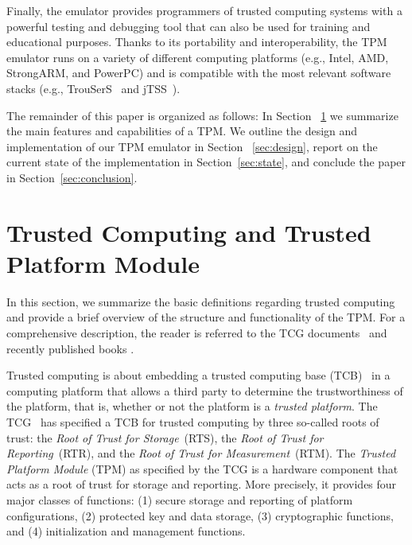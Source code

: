 \documentclass[runningheads]{llncs}
\begin{document}
Finally, the emulator provides
programmers of trusted computing systems with a powerful testing and
debugging tool that can also be used for training and educational purposes.
Thanks to its portability and interoperability, the TPM emulator runs on a
variety of different computing platforms (e.g., Intel, AMD, StrongARM, and
PowerPC) and is compatible with the most relevant software stacks (e.g.,
TrouSerS~\cite{trousers} and jTSS~\cite{jTSS}).

The remainder of this paper is organized as follows: In Section~%
\ref{sec:background} we summarize the main features and capabilities of a TPM.
We outline the design and implementation of our TPM emulator in Section~%
\ref{sec:design}, report on the current state of the implementation in
Section~\ref{sec:state}, and conclude the paper in Section~\ref{sec:conclusion}.


\section{Trusted Computing and Trusted Platform Module}\label{sec:background}
In this section, we summarize the basic definitions regarding trusted
computing and provide a brief overview of the structure and functionality of
the TPM. For a comprehensive description, the reader is referred to the TCG
documents~\cite{TCGArch,TPM} and recently published books \cite{Mitchell2005}.

Trusted computing is about embedding a trusted computing base
(TCB)~\cite{Bishop2003} in a computing platform that allows a third party
to determine the trustworthiness of the platform, that is, whether or not
the platform is a \emph{trusted platform}.
The TCG~\cite{TCGArch} has specified a TCB for trusted computing by three
so-called roots of trust: the \emph{Root of Trust for Storage}~(RTS), the
\emph{Root of Trust for Reporting}~(RTR), and the \emph{Root of Trust for
Measurement}~(RTM). The \emph{Trusted Platform Module} (TPM) as specified
by the TCG is a hardware component that acts as a root of trust for storage
and reporting. More precisely, it provides four major classes of functions:
(1) secure storage and reporting of platform configurations, (2) protected
key and data storage, (3) cryptographic functions, and (4) initialization
and management functions.
\end{document}

